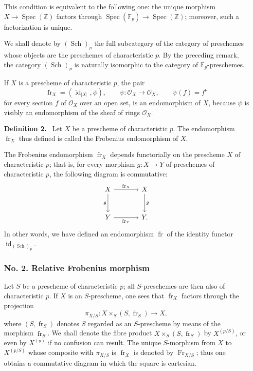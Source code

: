 \documentclass[11pt]{article}
\newenvironment{statement}[1]{\par\medskip\noindent\textbf{#1.}\ }{\par\medskip}
\DeclareMathOperator{\Spec}{Spec}
\providecommand{\OO}{\mathcal{O}}
\providecommand{\id}{\operatorname{id}}
\providecommand{\id}{\operatorname{id}}
\providecommand{\id}{\operatorname{id}}
\providecommand{\id}{\operatorname{id}}
\providecommand{\Spec}{\operatorname{Spec}}
\providecommand{\Spec}{\operatorname{Spec}}
\providecommand{\id}{\operatorname{id}}
\providecommand{\Spec}{\operatorname{Spec}}
\providecommand{\fr}{\operatorname{fr}}
\providecommand{\Fr}{\operatorname{Fr}}
\providecommand{\Sch}{\operatorname{Sch}}
\providecommand{\bF}{\mathbb F}
\providecommand{\bbZ}{\mathbb Z}
\begin{document}
This condition is equivalent to the following one: the unique morphism $X\to\Spec(\bbZ)$ factors through $\Spec(\bF_p)\to\Spec(\bbZ)$; moreover, such a factorization is unique.

We shall denote by $(\Sch)_p$ the full subcategory of the category of preschemes whose objects are the preschemes of characteristic $p$. By the preceding remark, the category $(\Sch)_p$ is naturally isomorphic to the category of $\bF_p$-preschemes.

If $X$ is a prescheme of characteristic $p$, the pair
\[
\fr_X=(\id_{|X|},\psi),
\qquad \psi:\OO_X\longrightarrow\OO_X,
\qquad \psi(f)=f^p
\]
for every section $f$ of $\OO_X$ over an open set, is an endomorphism of $X$, because $\psi$ is visibly an endomorphism of the sheaf of rings $\OO_X$.

\begin{statement}{Definition 2}
Let $X$ be a prescheme of characteristic $p$. The endomorphism $\fr_X$ thus defined is called the Frobenius endomorphism of $X$.
\end{statement}

The Frobenius endomorphism $\fr_X$ depends functorially on the prescheme $X$ of characteristic $p$; that is, for every morphism $g:X\to Y$ of preschemes of characteristic $p$, the following diagram is commutative:
\[
\begin{tikzcd}[column sep=large,row sep=large]
X \arrow[r,"\fr_X"] \arrow[d,"g"'] & X \arrow[d,"g"]\\
Y \arrow[r,"\fr_Y"'] & Y.
\end{tikzcd}
\]
In other words, we have defined an endomorphism $\fr$ of the identity functor $\id_{(\Sch)_p}$.

\subsubsection*{No. 2. Relative Frobenius morphism}

Let $S$ be a prescheme of characteristic $p$; all $S$-preschemes are then also of characteristic $p$. If $X$ is an $S$-prescheme, one sees that $\fr_X$ factors through the projection
\[
\pi_{X/S}:X\times_S(S,\fr_S)\longrightarrow X,
\]
where $(S,\fr_S)$ denotes $S$ regarded as an $S$-prescheme by means of the morphism $\fr_S$. We shall denote the fibre product $X\times_S(S,\fr_S)$ by $X^{(p/S)}$, or even by $X^{(p)}$ if no confusion can result. The unique $S$-morphism from $X$ to $X^{(p/S)}$ whose composite with $\pi_{X/S}$ is $\fr_X$ is denoted by $\Fr_{X/S}$; thus one obtains a commutative diagram in which the square is cartesian.
\end{document}
